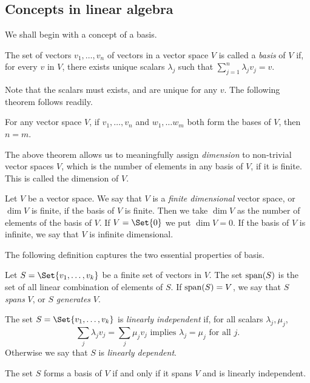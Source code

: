 \documentclass[main.tex]{subfiles}
\begin{document}
		\subsection{Concepts in linear algebra}
			We shall begin with a concept of a basis.
			\begin{definition}
				The set of vectors $v_1, \ldots, v_n$ of vectors in a vector space $V$ is called a \textit{basis} of $V$ if, for every $v$ in $V$, there exists unique scalars $\lambda_j$ such that $\sum_{j = 1}^{n}\lambda_j v_j = v$.
			\end{definition}
			Note that the scalars must exists, and are unique for any $v$. The following theorem follows readily.
			\begin{theorem}
				For any vector space $V$, if $v_1, \ldots, v_n$ and $w_1, \ldots w_m$ both form the bases of $V$, then $n = m$.
			\end{theorem}
			The above theorem allows us to meaningfully assign \textit{dimension} to non-trivial vector spaces $V$, which is the number of elements in any basis of $V$, if it is finite. This is called the dimension of $V$.
			\begin{definition}
				Let $V$ be a vector space. We say that $V$ is a \textit{finite dimensional} vector space, or $\dim V$ is finite, if the basis of $V$ is finite. Then we take $\dim V$ as the number of elements of the basis of $V$. If $V = \Set{0}$ we put $\dim V = 0$. If the basis of $V$ is infinite, we say that $V$ is infinite dimensional.
			\end{definition}
			The following definition captures the two essential properties of basis.
			\begin{definition}
				Let $S = \Set{v_1, \ldots, v_k}$ be a finite set of vectors in $V$. The set $\operatorname{span} (S)$ is the set of all linear combination of elements of $S$. If $\operatorname{span} (S) = V$, we say that $S$ \textit{spans} $V$, or $S$ \textit{generates} $V$.
			\end{definition}
			\begin{definition}
				The set $S = \Set{v_1, \ldots, v_k}$ is \textit{linearly independent} if, for all scalars $\lambda_j, \mu_j$,
				\begin{equation*}
					\sum_j \lambda_j v_j = \sum_j \mu_j v_j \text{ implies } \lambda_j = \mu_j \text{ for all $j$.}
				\end{equation*}
				Otherwise we say that $S$ is \textit{linearly dependent}.
			\end{definition}
			\begin{theorem}
				The set $S$ forms a basis of $V$ if and only if it spans $V$ and is linearly independent.
			\end{theorem}
		
\end{document}
